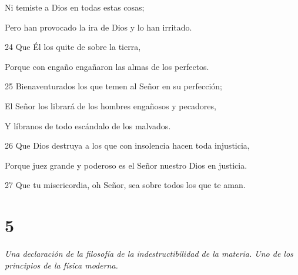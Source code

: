 \par     Ni temiste a Dios en todas estas cosas;
\par     Pero han provocado la ira de Dios y lo han irritado.
\par 24 Que Él los quite de sobre la tierra,
\par     Porque con engaño engañaron las almas de los perfectos.
\par   
\par 25 Bienaventurados los que temen al Señor en su perfección;
\par     El Señor los librará de los hombres engañosos y pecadores,
\par     Y líbranos de todo escándalo de los malvados.
\par 26 Que Dios destruya a los que con insolencia hacen toda injusticia,
\par     Porque juez grande y poderoso es el Señor nuestro Dios en justicia.
\par   
\par 27 Que tu misericordia, oh Señor, sea sobre todos los que te aman.

\chapter{5}

\par \textit{Una declaración de la filosofía de la indestructibilidad de la materia. Uno de los principios de la física moderna.}

